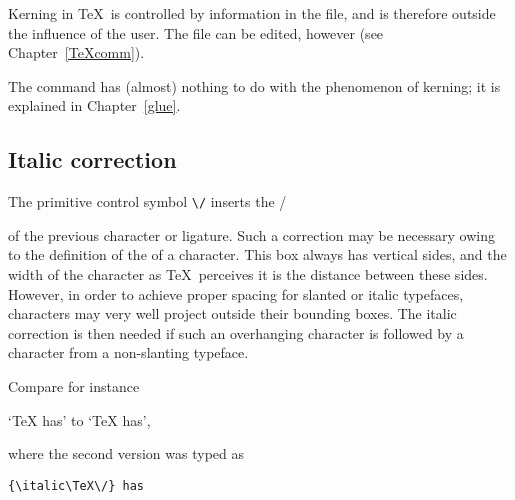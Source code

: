 \documentclass{book}
\begin{document}
Kerning in \TeX\ is controlled by information in the
 file, and is therefore outside the influence of the
user. The  file can be edited, however (see Chapter~\ref{TeXcomm}).

The  command has (almost) nothing to do with the
phenomenon of kerning; it is explained in Chapter~\ref{glue}.

\subsection{Italic correction}

The primitive control symbol \verb-\/- inserts the
\cstoidx /\par
of the previous character or ligature.
Such a correction may be necessary owing to the definition
of the  of a character. This box always
has vertical sides, and the width of the character as \TeX\
perceives it is the distance between these sides.
However, in order to achieve proper spacing  for slanted or
italic typefaces, characters may very well project outside their
bounding boxes. The italic correction is then needed if
such an overhanging character is followed by a
character from a non-slanting typeface.

Compare for instance
\begin{Disp} `{\italic\TeX} has'
to `{\italic\TeX\/} has',
\end{Disp} where the second version was typed as
\begin{verbatim}
{\italic\TeX\/} has
\end{verbatim}
\end{document}
